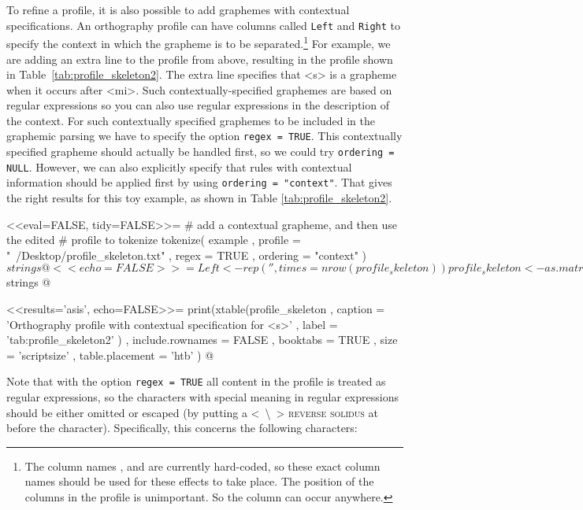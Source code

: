To refine a profile, it is also possible to add graphemes with contextual
specifications. An orthography profile can have columns called \texttt{Left} and
\texttt{Right} to specify the context in which the grapheme is to be
separated.\footnote{The column names ,  and
 are currently hard-coded, so these exact column names
should be used for these effects to take place. The position of the columns in
the profile is unimportant. So the column  can occur anywhere.}
For example, we are adding an extra line to the profile from above, resulting in
the profile shown in Table~\ref{tab:profile_skeleton2}. The extra line specifies
that <s> is a grapheme when it occurs after <mi>. Such contextually-specified
graphemes are based on regular expressions so you can also use regular
expressions in the description of the context. For such contextually specified
graphemes to be included in the graphemic parsing we have to specify the option
\texttt{regex = TRUE}. This contextually specified grapheme should actually be
handled first, so we could try \texttt{ordering = NULL}. However, we can also
explicitly specify that rules with contextual information should be applied
first by using \texttt{ordering = "context"}. That gives the right results for
this toy example, as shown in Table \ref{tab:profile_skeleton2}.

<<eval=FALSE, tidy=FALSE>>=
# add a contextual grapheme, and then use the edited 
# profile to tokenize
tokenize( example
         , profile = "~/Desktop/profile_skeleton.txt"
         , regex = TRUE
         , ordering = "context"
        )$strings
@

<<echo=FALSE>>=
Left <- rep('', times = nrow(profile_skeleton))
profile_skeleton <- as.matrix(cbind(Left, profile_skeleton))
profile_skeleton <- rbind(c('mi','s','','',''), profile_skeleton)
tokenize(example, profile = profile_skeleton, regex = TRUE, order='context')$strings
@

<<results='asis', echo=FALSE>>=
print(xtable(profile_skeleton
        , caption = 'Orthography profile with contextual specification for <s>'
        , label = 'tab:profile_skeleton2'
        )
  , include.rownames = FALSE
  , booktabs = TRUE
  , size = 'scriptsize'
  , table.placement = 'htb'
  )
@

Note that with the option \texttt{regex = TRUE} all
content in the profile is treated as regular expressions, so the characters with
special meaning in regular expressions should be either omitted or escaped (by
putting a <\ \backslash\ > \textsc{reverse solidus} at  before the
character). Specifically, this concerns the following characters:

